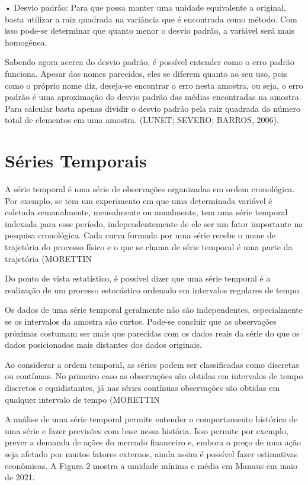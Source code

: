 \documentclass[
	12pt,				%
	openright,			%
	twoside,			%
	a4paper,			%
	english,			%
	french,				%
	spanish,			%
	brazil				%
	]{abntex2}
\begin{document}
•	Desvio padrão: Para que possa manter uma unidade equivalente a original, basta utilizar a raiz quadrada na variância que é encontrada como método. Com isso pode-se determinar que quanto menor o desvio padrão, a variável será mais homogênea.

Sabendo agora acerca do desvio padrão, é possível entender como o erro padrão funciona. Apesar dos nomes parecidos, eles se diferem quanto ao seu uso, pois como o próprio nome diz, deseja-se encontrar o erro nesta amostra, ou seja, o erro padrão é uma aproximação do desvio padrão das médias encontradas na amostra. Para calcular basta apenas dividir o desvio padrão pela raiz quadrada do número total de elementos em uma amostra. (LUNET; SEVERO; BARROS, 2006).

\section{Séries Temporais}

A série temporal é uma série de observações organizadas em ordem cronológica. Por exemplo, se tem um experimento em que uma determinada variável é coletada semanalmente, mensalmente ou anualmente, tem uma série temporal indexada para esse período, independentemente de ele ser um fator importante na pesquisa cronológica. Cada curva formada por uma série recebe o nome de trajetória do processo físico e o que se chama de série temporal é uma parte da trajetória (MORETTIN%

Do ponto de vista estatístico, é possível dizer que uma série temporal é a realização de um processo estocástico ordenado em intervalos regulares de tempo. 

Os dados de uma série temporal geralmente não são independentes, especialmente se os intervalos da amostra são curtos. Pode-se concluir que as observações próximas costumam ser mais que parecidas com os dados reais da série do que os dados posicionados mais distantes dos dados originais. 

Ao considerar a ordem temporal, as séries podem ser classificadas como discretas ou contínuas. No primeiro caso as observações são obtidas em intervalos de tempo discretos e equidistantes, já nas séries contínuas observações são obtidas em qualquer intervalo de tempo (MORETTIN%

A análise de uma série temporal permite entender o comportamento histórico de uma série e fazer previsões com base nessa história. Isso permite por exemplo, prever a demanda de ações do mercado financeiro e, embora o preço de uma ação seja afetado por muitos fatores externos, ainda assim é possível fazer estimativas econômicas. A Figura 2 mostra a umidade mínima e média em Manaus em maio de 2021.
\end{document}
